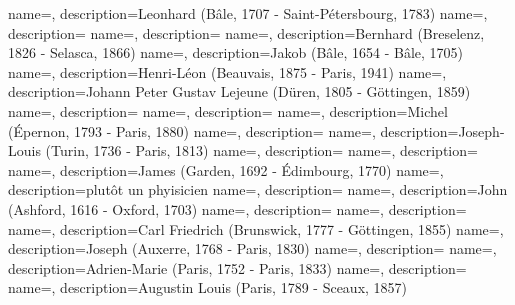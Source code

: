  {
    name=,
    description={Leonhard (Bâle, 1707 -  Saint-Pétersbourg, 1783)}
}
 {
    name=,
    description={}
}
 {
    name=,
    description={}
}
 {
    name=,
    description={Bernhard (Breselenz, 1826 - Selasca, 1866)}
}
 {
    name=,
    description={Jakob (Bâle, 1654 - Bâle, 1705)}
}
 {
    name=,
    description={Henri-Léon (Beauvais, 1875 - Paris, 1941)}
}
 {
    name=,
    description={Johann Peter Gustav Lejeune (Düren, 1805 - Göttingen, 1859)}
}
 {
    name=,
    description={}
}
 {
    name=,
    description={}
}
 {
    name=,
    description={Michel (Épernon, 1793 - Paris, 1880)}
}
 {
    name=,
    description={}
}
 {
    name=,
    description={Joseph-Louis (Turin, 1736 - Paris, 1813)}
}
 {
    name=,
    description={}
}
 {
    name=,
    description={}
}
 {
    name=,
    description={James  (Garden, 1692 - Édimbourg, 1770)}
}
 {
    name=,
    description={plutôt un phyisicien}
}
 {
    name=,
    description={}
}
 {
    name=,
    description={John  (Ashford, 1616 - Oxford, 1703)}
}
 {
    name=,
    description={}
}
 {
    name=,
    description={}
}
 {
    name=,
    description={Carl Friedrich (Brunswick, 1777 - Göttingen, 1855)}
}
 {
    name=,
    description={Joseph (Auxerre, 1768 - Paris, 1830)}
}
 {
    name=,
    description={}
}
 {
    name=,
    description={Adrien-Marie (Paris, 1752 - Paris, 1833)}
}
 {
    name=,
    description={}
}
 {
    name=,
    description={Augustin Louis (Paris, 1789 - Sceaux, 1857)}
}
